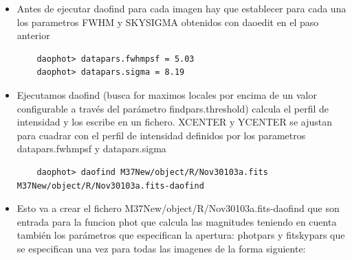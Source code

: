 \documentclass{article}
\begin{document}
\begin{itemize}
\item 
Antes de ejecutar daofind para cada imagen hay que establecer para cada una los parametros FWHM y SKYSIGMA obtenidos con daoedit en el paso anterior
 
\begin{verbatim}
	daophot> datapars.fwhmpsf = 5.03
	daophot> datapars.sigma = 8.19

\end{verbatim}


\item
Ejecutamos daofind (busca for maximos locales por encima de un valor configurable a través del parámetro  findpars.threshold) calcula el perfil de intensidad y los escribe en un fichero. XCENTER y YCENTER se ajustan para cuadrar con el perfil de intensidad definidos por los parametros datapars.fwhmpsf y datapars.sigma   
\begin{verbatim}
	daophot> daofind M37New/object/R/Nov30103a.fits  M37New/object/R/Nov30103a.fits-daofind
\end{verbatim}

\item Esto va a crear el fichero M37New/object/R/Nov30103a.fits-daofind que son entrada para la funcion phot que calcula las magnitudes teniendo en cuenta también los parámetros que especifican la apertura: photpars y fitskypars que se especifican una vez para todas las imagenes de la forma siguiente:

\end{itemize}
\end{document}

